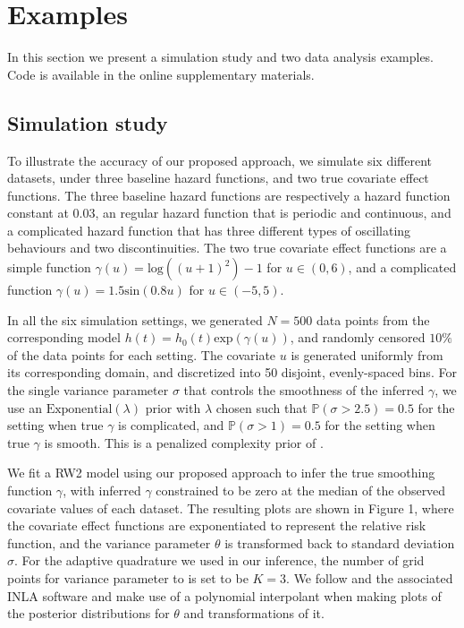 \documentclass[ba]{imsart}
\begin{document}
\section{Examples}\label{sec:example}

In this section we present a simulation study and two data analysis examples. Code is available in the online supplementary materials.

\subsection{Simulation study}\label{subsec:sim}

To illustrate the accuracy of our proposed approach, we simulate six different datasets, under three baseline hazard functions, and two true covariate effect functions. The three baseline hazard functions are respectively a hazard function constant at 0.03, an regular hazard function that is periodic and continuous, and a complicated hazard function that has three different types of oscillating behaviours and two discontinuities. The two true covariate effect functions are a simple function $\gamma(u) = \text{log}((u + 1)^2) - 1$ for $u \in (0,6)$, and a complicated function $\gamma(u) = 1.5 \text{sin}(0.8 u)$ for $ u \in (-5,5)$.

In all the six simulation settings, we  generated $N = 500$ data points from the corresponding model $h(t) = h_{0}(t) \text{exp}(\gamma(u))$, and randomly censored $10\%$ of the data points for each setting. The covariate $u$ is generated uniformly from its corresponding domain, and discretized into 50 disjoint, evenly-spaced bins. For the single variance parameter $\sigma$ that controls the smoothness of the inferred $\gamma$, we use an $\text{Exponential}(\lambda)$ prior with $\lambda$ chosen such that $\mathbb{P}\left( \sigma > 2.5\right) = 0.5$ for the setting when true $\gamma$ is complicated, and $\mathbb{P}\left( \sigma > 1\right) = 0.5$ for the setting when true $\gamma$ is smooth. This is a penalized complexity prior of \cite{pcprior}. 

We fit a RW2 model using our proposed approach to infer the true smoothing function $\gamma$, with inferred $\gamma$ constrained to be zero at the median of the observed covariate values of each dataset. The resulting plots are shown in Figure 1, where the covariate effect functions are exponentiated to represent the relative risk function, and the variance parameter $\theta$ is transformed back to standard deviation $\sigma$. For the adaptive quadrature we used in our inference, the number of grid points for variance parameter to is set to be $K = 3$. We follow \citet{inla} and the associated INLA software and make use of a polynomial interpolant when making plots of the posterior distributions for $\theta$ and transformations of it.
\end{document}
